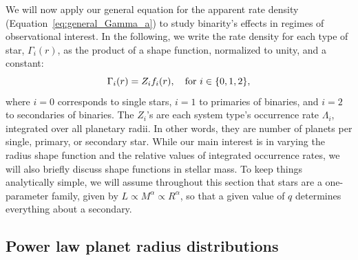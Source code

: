 \documentclass[12pt,modern]{aastex61}
\begin{document}
We will now apply our general equation for the apparent rate density
(Equation~\ref{eq:general_Gamma_a}) to study binarity's effects in
regimes of observational interest.  In the following, we write the
rate density for each type of star, $\Gamma_i(r)$, as the product of a
shape function, normalized to unity, and a constant:
\begin{equation}
    \Gamma_i(r) = Z_i f_i(r), \quad {\rm for\ }i\in\{0,1,2\},
\end{equation}
where $i=0$ corresponds to single stars, $i=1$ to primaries of
binaries, and $i=2$ to secondaries of binaries.
The $Z_i$'s are each system type's occurrence
rate $\Lambda_i$, integrated over all planetary radii. In other words,
they are number of planets per single, primary, or secondary star.
While our main interest is in varying the radius shape function
and the relative values of integrated occurrence rates, we 
will also briefly discuss shape functions in stellar mass.
To keep things analytically simple, we will assume throughout this
section that stars are a one-parameter family, given by 
$L \propto M^\alpha \propto R^\alpha$, so that a given value 
of $q$ determines everything about a secondary.


\subsection{Power law planet radius distributions}
\label{sec:model_2}
\end{document}
